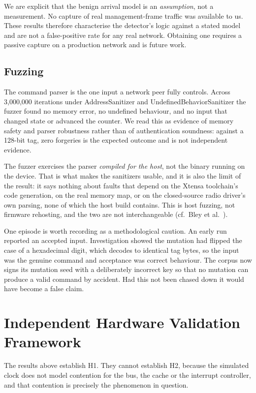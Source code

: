 We are explicit that the benign arrival model is an \emph{assumption}, not a measurement. No
capture of real management-frame traffic was available to us. These results therefore
characterise the detector's logic against a stated model and are not a false-positive rate for
any real network. Obtaining one requires a passive capture on a production network and is
future work.

\subsection{Fuzzing}

The command parser is the one input a network peer fully controls. Across 3{,}000{,}000
iterations under AddressSanitizer and UndefinedBehaviorSanitizer the fuzzer found no memory
error, no undefined behaviour, and no input that changed state or advanced the counter. We read
this as evidence of memory safety and parser robustness rather than of authentication soundness:
against a 128-bit tag, zero forgeries is the expected outcome and is not independent evidence.

The fuzzer exercises the parser \emph{compiled for the host}, not the binary running on the
device. That is what makes the sanitizers usable, and it is also the limit of the result: it
says nothing about faults that depend on the Xtensa toolchain's code generation, on the real
memory map, or on the closed-source radio driver's own parsing, none of which the host build
contains. This is host fuzzing, not firmware rehosting, and the two are not interchangeable
(cf.\ Bley et al.~\cite{pemu2025}).

One episode is worth recording as a methodological caution. An early run reported an accepted
input. Investigation showed the mutation had flipped the case of a hexadecimal digit, which
decodes to identical tag bytes, so the input was the genuine command and acceptance was correct
behaviour. The corpus now signs its mutation seed with a deliberately incorrect key so that no
mutation can produce a valid command by accident. Had this not been chased down it would have
become a false claim.

\section{Independent Hardware Validation Framework}\label{sec:hw}

The results above establish H1. They cannot establish H2, because the simulated clock does not
model contention for the bus, the cache or the interrupt controller, and that contention is
precisely the phenomenon in question.

